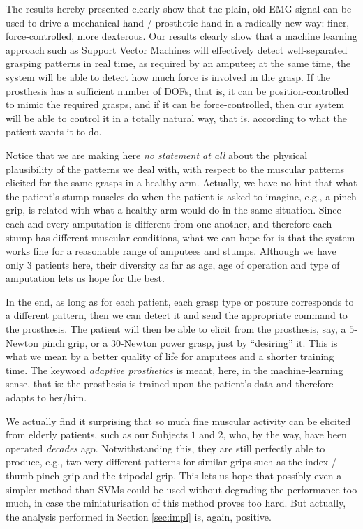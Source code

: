 The results hereby presented clearly show that the plain, old EMG
signal can be used to drive a mechanical hand / prosthetic hand in a
radically new way: finer, force-controlled, more dexterous. Our
results clearly show that a machine learning approach such as Support
Vector Machines will effectively detect well-separated grasping
patterns in real time, as required by an amputee; at the same time,
the system will be able to detect how much force is involved in the
grasp. If the prosthesis has a sufficient number of DOFs, that is, it
can be position-controlled to mimic the required grasps, and if it can
be force-controlled, then our system will be able to control it in a
totally natural way, that is, according to what the patient wants it
to do.

Notice that we are making here \emph{no statement at all} about the
physical plausibility of the patterns we deal with, with respect to
the muscular patterns elicited for the same grasps in a healthy
arm. Actually, we have no hint that what the patient's stump muscles
do when the patient is asked to imagine, e.g., a pinch grip, is
related with what a healthy arm would do in the same situation. Since
each and every amputation is different from one another, and therefore
each stump has different muscular conditions, what we can hope for is
that the system works fine for a reasonable range of amputees and
stumps. Although we have only $3$ patients here, their diversity as
far as age, age of operation and type of amputation lets us hope for
the best.

In the end, as long as for each patient, each grasp type or posture
corresponds to a different pattern, then we can detect it and send the
appropriate command to the prosthesis. The patient will then be able
to elicit from the prosthesis, say, a $5$-Newton pinch grip, or a
$30$-Newton power grasp, just by ``desiring'' it. This is what we mean
by a better quality of life for amputees and a shorter training
time. The keyword \emph{adaptive prosthetics} is meant, here, in the
machine-learning sense, that is: the prosthesis is trained upon the
patient's data and therefore adapts to her/him.

We actually find it surprising that so much fine muscular activity
can be elicited from elderly patients, such as our Subjects $1$ and
$2$, who, by the way, have been operated \emph{decades}
ago. Notwithstanding this, they are still perfectly able to produce,
e.g., two very different patterns for similar grips such as the index
/ thumb pinch grip and the tripodal grip. This lets us hope that
possibly even a simpler method than SVMs could be used without
degrading the performance too much, in case the miniaturisation of
this method proves too hard. But actually, the analysis performed in
Section \ref{sec:impl} is, again, positive.

